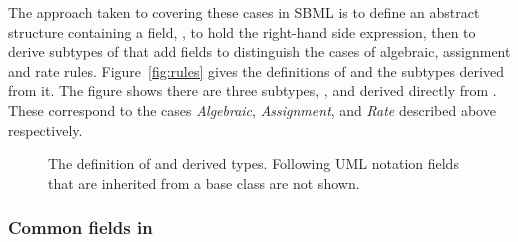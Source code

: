 The approach taken to covering these cases in SBML is to define an
abstract \Rule structure containing a field, , to hold
the right-hand side expression, then to derive subtypes of \Rule
that add fields to distinguish the cases of algebraic, assignment
and rate rules.  Figure~\vref{fig:rules} gives the definitions of
\Rule and the subtypes derived from it.  The figure shows there
are three subtypes, \AlgebraicRule, \AssignmentRule and \RateRule
derived directly from \Rule. These correspond to the cases
\emph{Algebraic}, \emph{Assignment}, and \emph{Rate} described
above respectively.

\begin{figure}[htb]
  \centering
  \caption{The definition of \Rule and derived types.
    Following UML notation fields
    that are inherited from a base class are not shown.}
  \label{fig:rules}
\end{figure}


\subsubsection{Common fields in }
\label{sec:rule-math}\label{sec:rule-fields}\label{sec:rule-sboterm}

